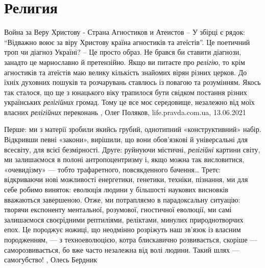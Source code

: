  
 
 
 
 
\chapter{Религия}
\label{sec:slova.religia}

Война за Веру Христову - Страна Агностиков и Атеистов
– У збірці є рядок: \enquote{Відважно воює за віру Христову країна агностиків та
атеїстів}. Це поетичний троп чи діагноз Україні?  – Це просто образ. Не брався
би ставити діагнози, занадто це марнославно й претензійно. Якщо ви питаєте про
\emph{релігію}, то крім агностиків та атеїстів маю велику кількість знайомих
вірян різних церков. До їхніх духовних пошуків та розчарувань ставлюсь із
повагою та розумінням. Якось так сталося, що ще з юнацького віку трапилося
бути свідком постання різних українських \emph{релігійних} громад. Тому це все
моє середовище, незалежно від моїх власних \emph{релігійних} переконань
, Олег Поляков, life.pravda.com.ua, 13.06.2021

Перше: ми з матерії зробили якийсь грубий, однотипний «конструктивний» набір.
Відкривши певні «закони», вирішили, що вони обов’язкові й універсальні для
всесвіту, для всієї безмірності. Друге: руйнуючи містичні, \emph{релігійні} картини
світу, ми залишаємося в полоні антропоцентризму і, якщо можна так висловитися,
«очевидізму» — тобто трафаретного, повсякденного бачення… Третє: відкриваючи
нові можливості енергетики, генетики, техніки, пізнання, ми для себе робимо
виняток: еволюція людини у більшості наукових висновків вважаються завершеною.
Отже, ми потрапляємо в парадоксальну ситуацію: творячи експоненту ментальної,
розумової, гностичної еволюції, ми самі залишаємося своєрідними рептиліями,
реліктами, минулих природнотворчих епох. Це породжує ножиці, що неодмінно
розріжуть наш зв’язок із власним породженням, — з техноеволюцією, котра
блискавично розвивається, скоріше — саморозвивається, бо вже часто незалежна
від волі людини. Такий шлях — самогубство!
, Олесь Бердник

